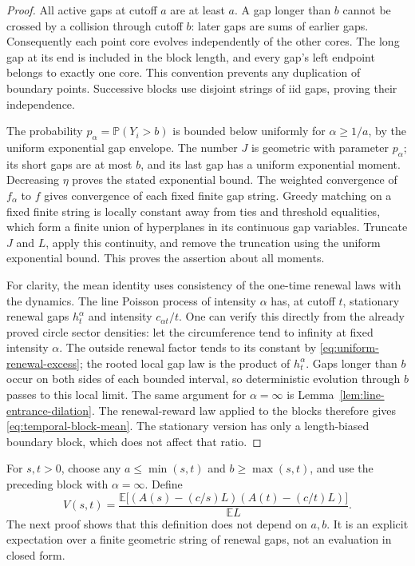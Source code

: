 \documentclass[11pt,letterpaper]{article}
\newcommand{\PP}{\mathbb P}\newcommand{\EE}{\mathbb E}
\begin{document}
\begin{proof}
All active gaps at cutoff $a$ are at least $a$. A gap longer
than $b$ cannot be crossed by a collision through cutoff $b$:
later gaps are sums of earlier gaps. Consequently each point
core evolves independently of the other cores. The long gap at
its end is included in the block length, and every gap's left
endpoint belongs to exactly one core. This convention prevents
any duplication of boundary points. Successive blocks use
disjoint strings of iid gaps, proving their independence.

The probability $p_\alpha=\PP(Y_i>b)$ is bounded below uniformly
for $\alpha\ge1/a$, by the uniform exponential gap envelope.
The number $J$ is geometric with parameter $p_\alpha$; its short
gaps are at most $b$, and its last gap has a uniform exponential
moment. Decreasing $\eta$ proves the stated exponential bound.
The weighted convergence of $f_\alpha$ to $f$ gives convergence
of each fixed finite gap string. Greedy matching on a fixed
finite string is locally constant away from ties and threshold
equalities, which form a finite union of hyperplanes in its
continuous gap variables. Truncate $J$ and $L$, apply this
continuity, and remove the truncation using the uniform
exponential bound. This proves the assertion about all moments.

For clarity, the mean identity uses consistency of the one-time
renewal laws with the dynamics. The line Poisson process of
intensity $\alpha$ has, at cutoff $t$, stationary renewal gaps
$h_t^\alpha$ and intensity $c_{\alpha t}/t$. One can verify this
directly from the already proved circle sector densities: let
the circumference tend to infinity at fixed intensity $\alpha$.
The outside renewal factor tends to its constant by
\eqref{eq:uniform-renewal-excess}; the rooted local gap law is
the product of $h_t^\alpha$. Gaps longer than $b$ occur on both
sides of each bounded interval, so deterministic evolution
through $b$ passes to this local limit. The same argument for
$\alpha=\infty$ is Lemma~\ref{lem:line-entrance-dilation}.
The renewal-reward law applied to the blocks therefore gives
\eqref{eq:temporal-block-mean}. The stationary version has only
a length-biased boundary block, which does not affect that ratio.
\end{proof}

For $s,t>0$, choose any $a\le\min(s,t)$ and
$b\ge\max(s,t)$, and use the preceding block with
$\alpha=\infty$. Define
\begin{equation}\label{eq:temporal-covariance-block}
 V(s,t)=\frac{\EE\big[(A(s)-(c/s)L)(A(t)-(c/t)L)\big]}{\EE L}.
\end{equation}
The next proof shows that this definition does not depend on
$a,b$. It is an explicit expectation over a finite geometric
string of renewal gaps, not an evaluation in closed form.
\end{document}
